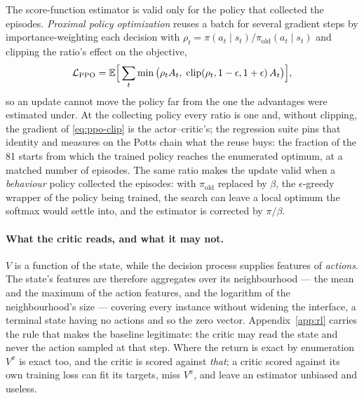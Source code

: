 \documentclass[11pt,a4paper]{article}
\begin{document}
The score-function estimator is valid only for the policy that collected the
episodes. \emph{Proximal policy optimization} \citep{schulman2017} reuses a
batch for several gradient steps by importance-weighting each decision with
$\rho_t = \pi(a_t \mid s_t) / \pi_{\mathrm{old}}(a_t \mid s_t)$ and clipping
the ratio's effect on the objective,
\begin{equation}
  \mathcal{L}_{\mathrm{PPO}} = \mathbb{E}\Big[\sum_t
    \min\big(\rho_t A_t,\; \mathrm{clip}(\rho_t, 1-\epsilon, 1+\epsilon)\, A_t\big)\Big],
  \label{eq:ppo-clip}
\end{equation}
so an update cannot move the policy far from the one the advantages were
estimated under. At the collecting policy every ratio is one and, without
clipping, the gradient of \eqref{eq:ppo-clip} is the actor--critic's; the
regression suite pins that identity and measures on the Potts chain what the
reuse buys: the fraction of the 81 starts from which the trained policy reaches
the enumerated optimum, at a matched number of episodes. The same ratio makes
the update valid when a \emph{behaviour} policy collected the episodes: with
$\pi_{\mathrm{old}}$ replaced by $\beta$, the $\epsilon$-greedy wrapper of the
policy being trained, the search can leave a local optimum the softmax would
settle into, and the estimator is corrected by $\pi / \beta$.

\paragraph{What the critic reads, and what it may not.}
$V$ is a function of the state, while the decision process supplies features
of \emph{actions}. The state's features are therefore aggregates over its
neighbourhood --- the mean and the maximum of the action features, and the
logarithm of the neighbourhood's size --- covering every instance without
widening the interface, a terminal state having no actions and so the zero
vector. Appendix~\ref{app:rl} carries the rule that makes the baseline
legitimate: the critic may read the state and never the action sampled at that
step. Where the return is exact by enumeration $V^\pi$ is exact too, and the
critic is scored against \emph{that}; a critic scored against its own training
loss can fit its targets, miss $V^\pi$, and leave an estimator unbiased and
useless.
\end{document}
